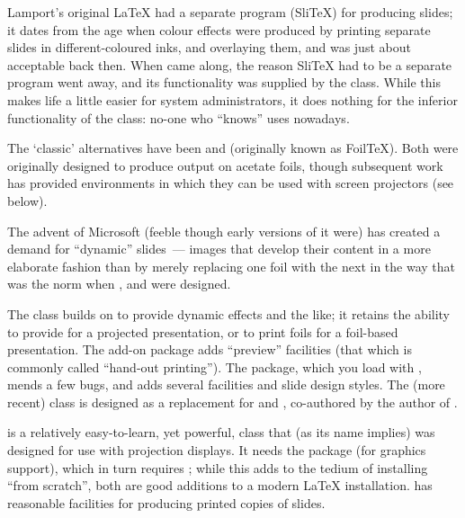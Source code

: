 
Lamport's original \LaTeX{} had a separate program (Sli\TeX{}) for
producing slides; it dates from the age when colour effects were
produced by printing separate slides in different-coloured inks, and
overlaying them, and was just about acceptable back then.  When
\LaTeXe{} came along, the reason Sli\TeX{} had to be a separate
program went away, and its functionality was supplied by the
 class.  While this makes life a little easier for
system administrators, it does nothing for the inferior functionality
of the class: no-one who ``knows'' uses  nowadays.

The `classic' alternatives have been  and 
(originally known as Foil\TeX{}).  Both were originally designed to
produce output on acetate foils, though subsequent work has provided
environments in which they can be used with screen projectors (see
below).

The advent of Microsoft  (feeble though early
versions of it were) has created a demand for ``dynamic'' slides~---
images that develop their content in a more elaborate fashion than by
merely replacing one foil with the next in the way that was the norm
when ,  and  were designed.

The  class builds on  to provide dynamic
effects and the like; it retains the ability to provide  for
a projected presentation, or to print foils for a foil-based
presentation.  The add-on package  adds ``preview''
facilities (that which is commonly called ``hand-out printing'').  The
 package, which you load with ,
mends a few bugs, and adds several facilities and slide design styles.
The (more recent)  class is designed as a
replacement for  and , co-authored
by the author of .

 is a relatively easy-to-learn, yet powerful, class that
(as its name implies) was designed for use with projection displays.
It needs the  package (for graphics support), which in
turn requires ; while this adds to the tedium of
installing  ``from scratch'', both are good additions to
a modern \LaTeX{} installation.   has reasonable
facilities for producing printed copies of slides.

